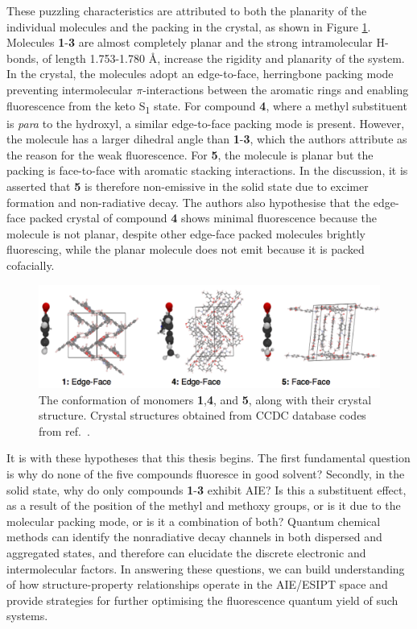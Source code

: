 These puzzling characteristics are attributed to both the planarity of the individual molecules and the packing in the crystal, as shown in Figure \ref{figure: HC_stacking}.  Molecules \textbf{1}-\textbf{3} are almost completely planar and the strong intramolecular H-bonds, of length 1.753-1.780 \si{\angstrom}, increase the rigidity and planarity of the system. In the crystal, the molecules adopt an edge-to-face, herringbone packing mode preventing intermolecular $\pi$-interactions between the aromatic rings and enabling fluorescence from the keto S\textsubscript{1} state. For compound \textbf{4}, where a methyl substituent is \textit{para} to the hydroxyl, a similar edge-to-face packing mode is present. However, the molecule has a larger dihedral angle than \textbf{1}-\textbf{3}, which the authors attribute as the reason for the weak fluorescence. For \textbf{5}, the molecule is planar but the packing is face-to-face with aromatic stacking interactions. In the discussion, it is asserted that \textbf{5} is therefore non-emissive in the solid state due to excimer formation and non-radiative decay. The authors also hypothesise that the edge-face packed crystal of compound \textbf{4} shows minimal fluorescence because the molecule is not planar, despite other edge-face packed molecules brightly fluorescing, while the planar molecule does not emit because it is packed cofacially.
\begin{figure}[t]
\centering
  \includegraphics[width=0.95\linewidth]{1Intro/HC_stacking-screenshot}
  \caption[Crystal structures of 2'-hydroxychalcone derivatives]{The conformation of monomers \textbf{1},\textbf{4}, and \textbf{5}, along with their crystal structure. Crystal structures obtained from CCDC database codes from ref.~.}
  \label{figure: HC_stacking}
\end{figure}
It is with these hypotheses that this thesis begins. The first fundamental question is why do none of the five compounds fluoresce in good solvent? Secondly, in the solid state, why do only compounds \textbf{1}-\textbf{3} exhibit \ac{AIE}? Is this a substituent effect, as a result of the position of the methyl and methoxy groups, or is it due to the molecular packing mode, or is it a combination of both? Quantum chemical methods can identify the nonradiative decay channels in both dispersed and aggregated states, and therefore can elucidate the discrete electronic and intermolecular factors. In answering these questions, we can build understanding of how structure-property relationships operate in the \ac{AIE}/\ac{ESIPT} space and provide strategies for further optimising the fluorescence quantum yield of such systems.
